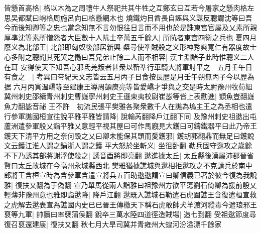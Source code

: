 皆懸首高格|{
	格以木為之周禮牛人祭祀共其牛牲之互鄭玄曰互若今屠家之懸肉格左思吴都賦曰峭格周施呂向曰格懸網木也}
燒鐵灼目酋長自誣與义謀反聰謂沈等曰吾今而後知卿等之忠也當念知無不言勿恨往日言而不用也於是誅東宫官屬及乂素所親厚凖沈等素所憎怨者大臣數十人阬士卒萬五千餘人|{
	所阬者東宫四衛之兵也}
夏四月廢义為北部王|{
	北部即匈奴後部居新興}
粲尋使凖賊殺之义形神秀爽寛仁有器度故士心多附之聰聞其死哭之慟曰吾兄弟止餘二人而不相容|{
	漢主淵諸子此時惟聰义二人在耳}
安得使天下知吾心邪氐羌叛者甚衆以靳凖行車騎大將軍討平之　五月壬午日有食之　|{
	考異曰帝紀天文志皆云五月丙子日食按長歷是月壬午朔無丙子今以歷為据}
六月丙寅温嶠等至建康王導周顗庾亮等皆愛嶠才爭與之交是時太尉豫州牧荀組冀州刺史邵續青州刺史曹嶷寧州刺史王遜東夷校尉崔毖等皆上表勸進|{
	顗魚豈翻嶷魚力翻毖音祕}
王不許　初流民張平樊雅各聚衆數千人在譙為塢主王之為丞相也遣行參軍譙國桓宣往說平雅平雅皆請降|{
	說輸芮翻降戶江翻下同}
及豫州刺史祖逖出屯蘆洲遣參軍殷乂詣平雅乂意輕平視其屋曰可作馬廐見大鑊曰可鑄鐵器平曰此乃帝王鑊天下清平方用之奈何毁之乂曰卿未能保其頭而愛鑊邪|{
	鑊胡郭翻鼎而無足曰鑊說文云鑊江淮人謂之鍋浙人謂之鑊}
平大怒於坐斬义|{
	坐徂卧翻}
勒兵固守逖攻之歲餘不下乃誘其部將謝浮使殺之|{
	誘音酉將即亮翻}
逖進據太丘|{
	太丘縣後漢屬沛郡晉省賢曰太丘故城在今亳州永城縣西北}
樊雅猶據譙城與逖相拒逖攻之不克請兵於南中郎將王含桓宣時為含參軍含遣宣將兵五百助逖逖謂宣曰卿信義已著於彼今復為我說雅|{
	復扶又翻為于偽翻}
宣乃單馬從兩人詣雅曰祖豫州方欲平蕩劉石倚卿為援前殷乂輕薄非豫州意也雅即詣逖降|{
	降戶江翻}
逖既入譙城石勒遣石虎圍譙王含復遣桓宣救之虎解去逖表宣為譙國内史已已晉王傳檄天下稱石虎敢帥犬羊渡河縱毒今遣琅邪王裒等九軍|{
	帥讀曰率裦蒲侯翻}
銳卒三萬水陸四道徑造賊場|{
	造七到翻}
受祖逖節度尋復召裒還建康|{
	復扶又翻}
秋七月大旱司冀并青雍州大蝗河汾溢漂千餘家

